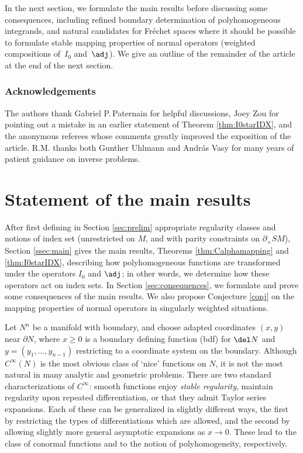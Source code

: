 In the next section, we formulate the main results before discussing some consequences, including refined boundary determination of polyhomogeneous integrands, and natural candidates for Fréchet spaces where it should be possible to formulate stable mapping properties of normal operators (\ie weighted compositions of~$I_0$ and~$\adj$). We give an outline of the remainder of the article at the end of the next section.

\subsubsection*{Acknowledgements} The authors thank Gabriel P.\,Paternain for helpful discussions, Joey Zou for pointing out a mistake in an earlier statement of Theorem \ref{thm:I0starIDX}, and the anonymous referees whose comments greatly improved the exposition of the article. R.M. thanks both Gunther Uhlmann and András Vasy for many years of patient guidance on inverse problems.

\section{Statement of the main results} \label{sec:main}

After first defining in Section \ref{sec:prelim} appropriate regularity classes and notions of index set (unrestricted on $M$, and with parity constraints on $\partial_+ SM$), Section \ref{ssec:main} gives the main results, Theorems \ref{thm:Calphamapping} and \ref{thm:I0starIDX}, describing how polyhomogeneous functions are transformed under the operators $I_0$ and $\adj $; in other words, we determine how these operators act on index sets. In Section \ref{sec:consequences}, we formulate and prove some consequences of the main results. We also propose Conjecture \ref{conj} on the mapping properties of normal operators in singularly weighted situations.

 \label{sec:prelim}

Let $N^n$ be a manifold with boundary, and choose adapted coordinates $(x,y)$ near $\partial N$, where $x \geq 0$ is a boundary defining function (bdf) for $\del N$ and $y = (y_1, \dots, y_{n-1})$ restricting to a coordinate system on the boundary. Although $C^\infty(N)$ is the most obvious class of `nice' functions on $N$, it is not the most natural in many analytic and geometric problems. There are two standard characterizations of $C^\infty$: smooth functions enjoy {\it stable regularity}, \ie maintain regularity upon repeated differentiation, or that they admit Taylor series expansions. Each of these can be generalized in slightly different ways, the first by restricting the types of differentiations which are allowed, and the second by allowing slightly more general asymptotic expansions as $x \to 0$. These lead to the class of conormal functions and to the notion of polyhomogeneity, respectively.

